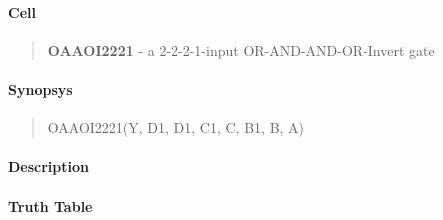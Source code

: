 \label{OAAOI2221}
\paragraph{Cell}
\begin{quote}
    \textbf{OAAOI2221} - a 2-2-2-1-input OR-AND-AND-OR-Invert gate
\end{quote}

\paragraph{Synopsys}
\begin{quote}
    OAAOI2221(Y, D1, D1, C1, C, B1, B, A)
\end{quote}

\paragraph{Description}

%

\paragraph{Truth Table}
%

